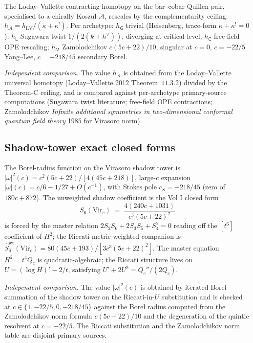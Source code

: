 The Loday--Vallette contracting homotopy on the bar--cobar Quillen
pair, specialised to a chirally Koszul \(\mathcal{A}\), rescales by the
complementarity ceiling: \(h_{\mathcal{A}} = h_{\mathrm{LV}}/(\kappa+\kappa^{!})\).
Per archetype: \(h_{\mathsf G}\) trivial (Heisenberg, trace-form
\(\kappa+\kappa^{!}=0\)); \(h_{\mathsf L}\) Sugawara twist \(1/(2(k+h^\vee))\),
diverging at critical level; \(h_{\mathsf C}\) free-field OPE rescaling;
\(h_{\mathsf M}\) Zamolodchikov \(c(5c+22)/10\), singular at \(c=0\),
\(c=-22/5\) Yang--Lee, \(c=-218/45\) secondary Borel.

\noindent\emph{Independent comparison.} The value \(h_{\mathcal{A}}\)
is obtained from the Loday--Vallette universal homotopy
(Loday--Vallette 2012 Theorem~\(11.3.2\)) divided by the Theorem-C
ceiling, and is compared against per-archetype primary-source
computations (Sugawara
twist literature; free-field OPE contractions; Zamolodchikov
\textit{Infinite additional symmetries in two-dimensional conformal
quantum field theory} 1985 for Virasoro norm).

\subsection{Shadow-tower exact closed forms}
\label{v4-subsec:shadow-tower-closed-forms}

The Borel-radius function on the Virasoro shadow tower is
\(|\omega|^{2}(c) = c^{2}(5c+22)/[4(45c+218)]\), large-\(c\) expansion
\(|\omega|(c) = c/6 - 1/27 + O(c^{-1})\), with Stokes pole
\(c_S = -218/45\) (zero of \(180c+872\)). The unweighted shadow coefficient
is the Vol I closed form
\[
S_6(\mathrm{Vir}_c) \;=\; \frac{4(240c+1031)}{c^{3}(5c+22)^{2}}
\]
is forced by the master relation
\(2S_2 S_6 + 2S_3 S_5 + S_4^{2} = 0\) reading off the
\([t^{6}]\) coefficient of \(H^{2}\); the Riccati-metric weighted
companion is
\(\widehat{S}_6^{\mathrm{wt}}(\mathrm{Vir}_c) = 80(45c+193)/[3c^{3}(5c+22)^{2}]\).
The master equation \(H^2 = t^4 Q_c\) is
quadratic-algebraic; the Riccati structure lives on
\(U = (\log H)' - 2/t\), satisfying \(U' + 2U^2 = Q_c''/(2Q_c)\).

\noindent\emph{Independent comparison.} The value
\(|\omega|^2(c)\) is obtained by iterated Borel summation of the shadow
tower on the Riccati-in-\(U\) substitution and is checked at
\(c \in \{1, -22/5, 0, -218/45\}\) against the Borel
radius computed from the Zamolodchikov norm formula
\(c(5c+22)/10\) and the degeneration of the quintic resolvent at
\(c=-22/5\). The Riccati substitution and the Zamolodchikov norm table
are disjoint primary sources.

